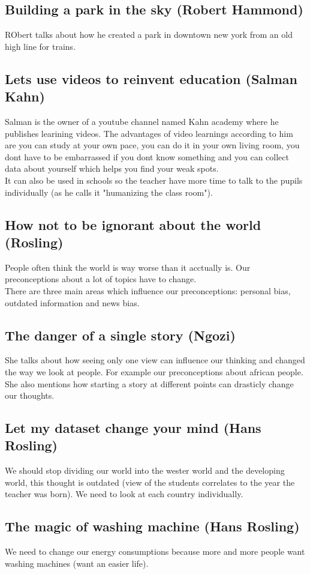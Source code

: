 \documentclass{article}
\begin{document}
\subsection{Building a park in the sky (Robert Hammond)}
RObert talks about how he created a park in downtown new york from an old high line for trains.
\subsection{Lets use videos to reinvent education (Salman Kahn)}
Salman is the owner of a youtube channel named Kahn academy where he publishes learining videos. The advantages of video learnings according to him are you can study at your own pace, you can do it in your own living room, you dont have to be embarrassed if you dont know something and you can collect data about yourself which helps you find your weak spots. \\
It can also be used in schools so the teacher have more time to talk to the pupils individually (as he calls it "humanizing the class room").
\subsection{How not to be ignorant about the world (Rosling)}
People often think the world is way worse than it acctually is. Our preconceptions about a lot of topics have to change. \\
There are three main areas which influence our preconceptions: personal bias, outdated information and news bias. 
\subsection{The danger of a single story (Ngozi)}
She talks about how seeing only one view can influence our thinking and changed the way we look at people. For example our preconceptions about african people. She also mentions how starting a story at different points can drasticly change our thoughts.
\subsection{Let my dataset change your mind (Hans Rosling)}
We should stop dividing our world into the wester world and the developing world, this thought is outdated (view of the students correlates to the year the teacher was born). We need to look at each country individually.
\subsection{The magic of washing machine (Hans Rosling)}
We need to change our energy consumptions because more and more people want washing machines (want an easier life).
\end{document}
